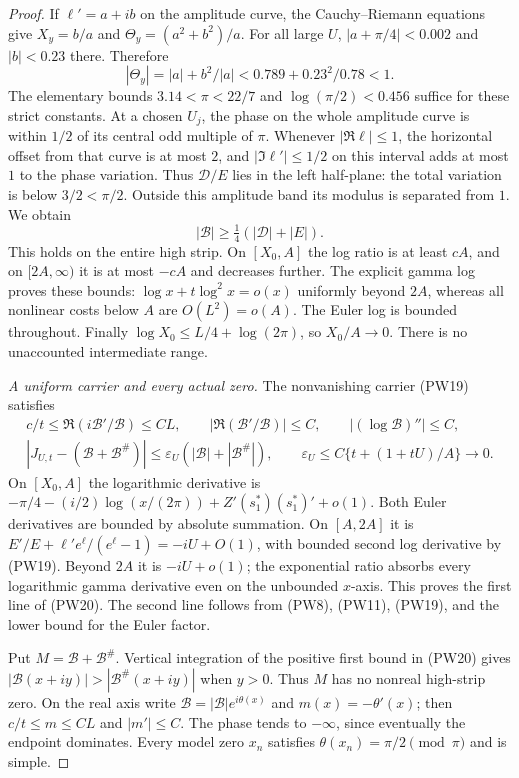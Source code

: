 \documentclass[11pt]{article}
\theoremstyle{remark}\newtheorem{remark}[theorem]{Remark}
\begin{document}
\begin{proof}
If $\ell'=a+ib$ on the amplitude curve, the Cauchy--Riemann equations
give $X_y=b/a$ and $\Theta_y=(a^2+b^2)/a$. For all large $U$,
$|a+\pi/4|<0.002$ and $|b|<0.23$ there. Therefore
\[
 |\Theta_y|=|a|+b^2/|a|
            <0.789+0.23^2/0.78<1.                 \tag{PW18}
\]
The elementary bounds $3.14<\pi<22/7$ and $\log(\pi/2)<0.456$
suffice for these strict constants. At a chosen $U_j$, the phase
on the whole amplitude curve is within $1/2$ of its central odd
multiple of $\pi$. Whenever $|\Re\ell|\le1$, the horizontal
offset from that curve is at most $2$, and $|\Im\ell'|\le1/2$
on this interval adds at most $1$ to the phase variation.
Thus $\mathcal D/E$ lies in the left half-plane:
the total variation is below $3/2<\pi/2$. Outside this amplitude
band its modulus is separated from $1$. We obtain
\[
 |\mathcal B|\ge\tfrac14(|\mathcal D|+|E|).         \tag{PW19}
\]
This holds on the entire high strip. On $[X_0,A]$ the log ratio
is at least $cA$, and on $[2A,\infty)$ it is at most $-cA$ and
decreases further. The explicit gamma log proves these bounds:
$\log x+t\log^2x=o(x)$ uniformly beyond $2A$, whereas all
nonlinear costs below $A$ are $O(L^2)=o(A)$.
The Euler log is bounded throughout. Finally
$\log X_0\le L/4+\log(2\pi)$, so $X_0/A\to0$.
There is no unaccounted intermediate range.

\emph{A uniform carrier and every actual zero.}
The nonvanishing carrier (PW19) satisfies
\[
 \begin{gathered}
 c/t\le\Re(i\mathcal B'/\mathcal B)\le CL,\qquad
 |\Re(\mathcal B'/\mathcal B)|\le C,\qquad
 |(\log\mathcal B)''|\le C,\\
 |J_{U,t}-(\mathcal B+\mathcal B^\#)|
       \le\varepsilon_U(|\mathcal B|+|\mathcal B^\#|),\qquad
 \varepsilon_U\le C\{t+(1+tU)/A\}\longrightarrow0.
 \end{gathered}                                      \tag{PW20}
\]
On $[X_0,A]$ the logarithmic derivative is
$-\pi/4-(i/2)\log(x/(2\pi))+Z'(s_1^*)(s_1^*)'+o(1)$.
Both Euler derivatives are bounded by absolute summation.
On $[A,2A]$ it is
$E'/E+\ell'e^\ell/(e^\ell-1)=-iU+O(1)$, with bounded
second log derivative by (PW19). Beyond $2A$ it is $-iU+o(1)$;
the exponential ratio absorbs every logarithmic gamma derivative
even on the unbounded $x$-axis. This proves the first line of
(PW20). The second line follows from (PW8), (PW11), (PW19), and
the lower bound for the Euler factor.

Put $M=\mathcal B+\mathcal B^\#$. Vertical integration of the
positive first bound in (PW20) gives
$|\mathcal B(x+iy)|>|\mathcal B^\#(x+iy)|$ when $y>0$.
Thus $M$ has no nonreal high-strip zero. On the real axis write
$\mathcal B=|\mathcal B|e^{i\theta(x)}$ and
$m(x)=-\theta'(x)$; then $c/t\le m\le CL$ and $|m'|\le C$.
The phase tends to $-\infty$, since eventually the endpoint dominates.
Every model zero $x_n$ satisfies $\theta(x_n)=\pi/2\pmod\pi$
and is simple.


\end{proof}
\end{document}
